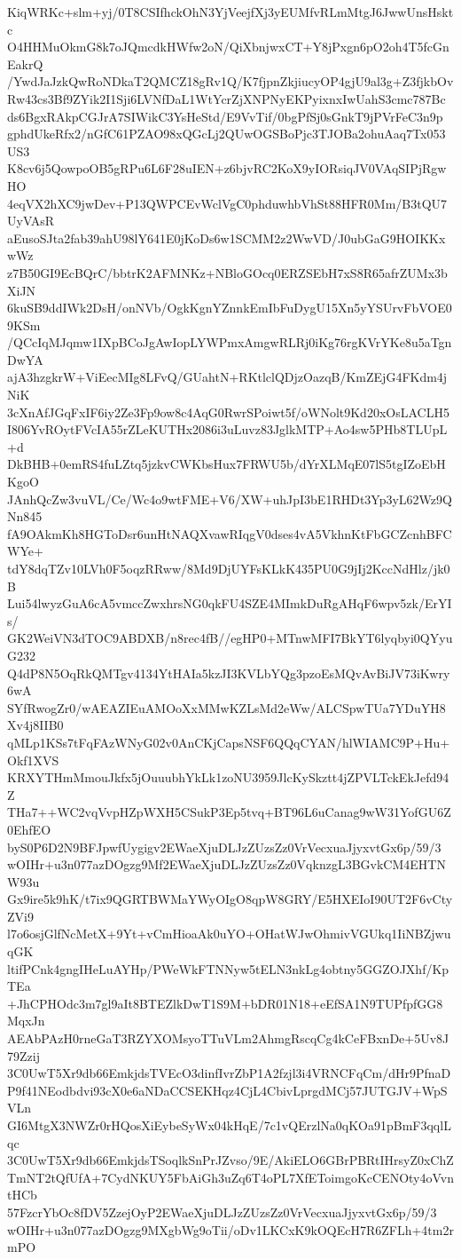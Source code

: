 KiqWRKc+slm+yj/0T8CSIfhckOhN3YjVeejfXj3yEUMfvRLmMtgJ6JwwUnsHsktc
O4HHMuOkmG8k7oJQmcdkHWfw2oN/QiXbnjwxCT+Y8jPxgn6pO2oh4T5fcGnEakrQ
/YwdJaJzkQwRoNDkaT2QMCZ18gRv1Q/K7fjpnZkjiucyOP4gjU9al3g+Z3fjkbOv
Rw43cs3Bf9ZYik2I1Sji6LVNfDaL1WtYcrZjXNPNyEKPyixnxIwUahS3cmc787Bc
ds6BgxRAkpCGJrA7SIWikC3YsHeStd/E9VvTif/0bgPfSj0sGnkT9jPVrFeC3n9p
gphdUkeRfx2/nGfC61PZAO98xQGcLj2QUwOGSBoPjc3TJOBa2ohuAaq7Tx053US3
K8cv6j5QowpoOB5gRPu6L6F28uIEN+z6bjvRC2KoX9yIORsiqJV0VAqSIPjRgwHO
4eqVX2hXC9jwDev+P13QWPCEvWclVgC0phduwhbVhSt88HFR0Mm/B3tQU7UyVAsR
aEusoSJta2fab39ahU98lY641E0jKoDs6w1SCMM2z2WwVD/J0ubGaG9HOIKKxwWz
z7B50GI9EcBQrC/bbtrK2AFMNKz+NBloGOcq0ERZSEbH7xS8R65afrZUMx3bXiJN
6kuSB9ddIWk2DsH/onNVb/OgkKgnYZnnkEmIbFuDygU15Xn5yYSUrvFbVOE09KSm
/QCcIqMJqmw1IXpBCoJgAwIopLYWPmxAmgwRLRj0iKg76rgKVrYKe8u5aTgnDwYA
ajA3hzgkrW+ViEecMIg8LFvQ/GUahtN+RKtlclQDjzOazqB/KmZEjG4FKdm4jNiK
3cXnAfJGqFxIF6iy2Ze3Fp9ow8c4AqG0RwrSPoiwt5f/oWNolt9Kd20xOsLACLH5
I806YvROytFVcIA55rZLeKUTHx2086i3uLuvz83JglkMTP+Ao4sw5PHb8TLUpL+d
DkBHB+0emRS4fuLZtq5jzkvCWKbsHux7FRWU5b/dYrXLMqE07lS5tgIZoEbHKgoO
JAnhQcZw3vuVL/Ce/Wc4o9wtFME+V6/XW+uhJpI3bE1RHDt3Yp3yL62Wz9QNn845
fA9OAkmKh8HGToDsr6unHtNAQXvawRIqgV0dses4vA5VkhnKtFbGCZcnhBFCWYe+
tdY8dqTZv10LVh0F5oqzRRww/8Md9DjUYFsKLkK435PU0G9jIj2KccNdHlz/jk0B
Lui54lwyzGuA6cA5vmccZwxhrsNG0qkFU4SZE4MImkDuRgAHqF6wpv5zk/ErYIs/
GK2WeiVN3dTOC9ABDXB/n8rec4fB//egHP0+MTnwMFI7BkYT6lyqbyi0QYyuG232
Q4dP8N5OqRkQMTgv4134YtHAIa5kzJI3KVLbYQg3pzoEsMQvAvBiJV73iKwry6wA
SYfRwogZr0/wAEAZIEuAMOoXxMMwKZLsMd2eWw/ALCSpwTUa7YDuYH8Xv4j8IIB0
qMLp1KSs7tFqFAzWNyG02v0AnCKjCapsNSF6QQqCYAN/hlWIAMC9P+Hu+Okf1XVS
KRXYTHmMmouJkfx5jOuuubhYkLk1zoNU3959JlcKySkztt4jZPVLTckEkJefd94Z
THa7++WC2vqVvpHZpWXH5CSukP3Ep5tvq+BT96L6uCanag9wW31YofGU6Z0EhfEO
byS0P6D2N9BFJpwfUygigv2EWaeXjuDLJzZUzsZz0VrVecxuaJjyxvtGx6p/59/3
wOIHr+u3n077azDOgzg9Mf2EWaeXjuDLJzZUzsZz0VqknzgL3BGvkCM4EHTNW93u
Gx9ire5k9hK/t7ix9QGRTBWMaYWyOIgO8qpW8GRY/E5HXEIoI90UT2F6vCtyZVi9
l7o6osjGlfNcMetX+9Yt+vCmHioaAk0uYO+OHatWJwOhmivVGUkq1IiNBZjwuqGK
ltifPCnk4gngIHeLuAYHp/PWeWkFTNNyw5tELN3nkLg4obtny5GGZOJXhf/KpTEa
+JhCPHOdc3m7gl9aIt8BTEZlkDwT1S9M+bDR01N18+eEfSA1N9TUPfpfGG8MqxJn
AEAbPAzH0rneGaT3RZYXOMsyoTTuVLm2AhmgRscqCg4kCeFBxnDe+5Uv8J79Zzij
3C0UwT5Xr9db66EmkjdsTVEcO3dinfIvrZbP1A2fzjl3i4VRNCFqCm/dHr9PfnaD
P9f41NEodbdvi93cX0e6aNDaCCSEKHqz4CjL4CbivLprgdMCj57JUTGJV+WpSVLn
GI6MtgX3NWZr0rHQosXiEybeSyWx04kHqE/7c1vQErzlNa0qKOa91pBmF3qqlLqc
3C0UwT5Xr9db66EmkjdsTSoqlkSnPrJZvso/9E/AkiELO6GBrPBRtIHrsyZ0xChZ
TmNT2tQfUfA+7CydNKUY5FbAiGh3uZq6T4oPL7XfEToimgoKcCENOty4oVvntHCb
57FzcrYbOc8fDV5ZzejOyP2EWaeXjuDLJzZUzsZz0VrVecxuaJjyxvtGx6p/59/3
wOIHr+u3n077azDOgzg9MXgbWg9oTii/oDv1LKCxK9kOQEcH7R6ZFLh+4tm2rmPO
